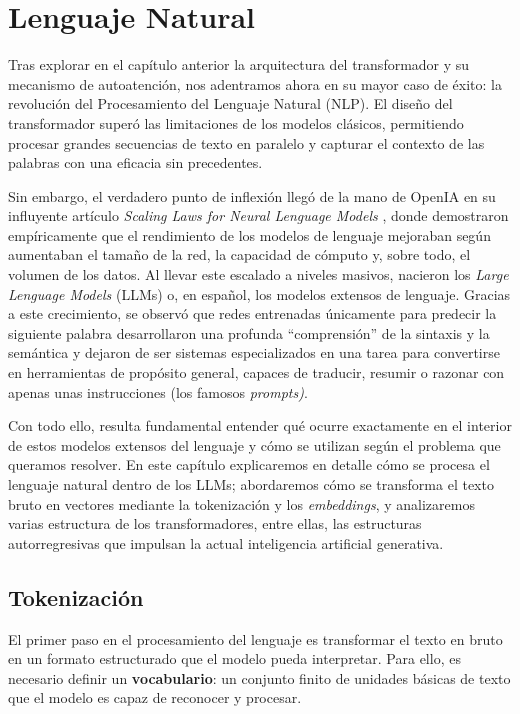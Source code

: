 \chapter{Lenguaje Natural}
\label{cap:Lenguaje_Natural}

Tras explorar en el capítulo anterior la arquitectura del transformador y su mecanismo de autoatención, nos adentramos ahora en su mayor caso de éxito: la revolución del Procesamiento del Lenguaje Natural (NLP). El diseño del transformador superó las limitaciones de los modelos clásicos, permitiendo procesar grandes secuencias de texto en paralelo y capturar el contexto de las palabras con una eficacia sin precedentes.

Sin embargo, el verdadero punto de inflexión llegó de la mano de OpenIA en su influyente artículo \textit{Scaling Laws for Neural Lenguage Models} \cite{kaplan2020scaling}, donde demostraron empíricamente que el rendimiento de los modelos de lenguaje mejoraban según aumentaban el tamaño de la red, la capacidad de cómputo y, sobre todo, el volumen de los datos. Al llevar este escalado a niveles masivos, nacieron los \textit{Large Lenguage Models} (LLMs) o, en español, los modelos extensos de lenguaje. Gracias a este crecimiento, se observó que redes entrenadas únicamente para predecir la siguiente palabra desarrollaron una profunda ``comprensión'' de la sintaxis y la semántica y dejaron de ser sistemas especializados en una tarea para convertirse en herramientas de propósito general, capaces de traducir, resumir o razonar con apenas unas instrucciones (los famosos \textit{prompts)}.

Con todo ello, resulta fundamental entender qué ocurre exactamente en el interior de 
estos modelos extensos del lenguaje y cómo se utilizan según el problema que 
queramos resolver. En este capítulo explicaremos en detalle cómo se procesa el 
lenguaje natural dentro de los LLMs; abordaremos cómo se transforma el texto bruto 
en vectores mediante la tokenización y los \textit{embeddings}, y analizaremos varias  
estructura de los transformadores, entre ellas, las estructuras autorregresivas que 
impulsan la actual inteligencia artificial generativa.


\section{Tokenización}

El primer paso en el procesamiento del lenguaje es transformar el texto en bruto en un formato estructurado que el modelo pueda interpretar. Para ello, es necesario definir un \textbf{vocabulario}: un conjunto finito de unidades básicas de texto que el modelo es capaz de reconocer y procesar.

